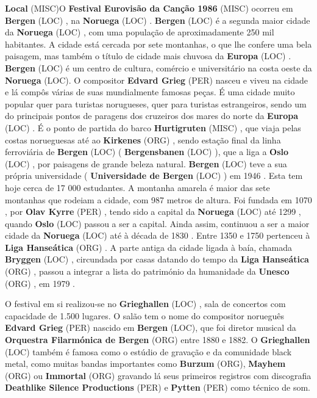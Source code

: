\documentclass[12pt,a4paper]{article}
\begin{document}
\textbf{Local} (MISC)O \textbf{Festival Eurovisão da Canção 1986} (MISC) ocorreu em \textbf{Bergen} (LOC) , na \textbf{Noruega} (LOC) . \textbf{Bergen} (LOC) é a segunda maior cidade da \textbf{Noruega} (LOC) , com uma população de aproximadamente 250 mil habitantes. A cidade está cercada por sete montanhas, o que lhe confere uma bela paisagem, mas também o título de cidade mais chuvosa da \textbf{Europa} (LOC) . \textbf{Bergen} (LOC) é um centro de cultura, comércio e universitário na costa oeste da \textbf{Noruega} (LOC). O compositor \textbf{Edvard Grieg} (PER) nasceu e viveu na cidade e lá compôs várias de suas mundialmente famosas peças. É uma cidade muito popular quer para turistas norugueses, quer para turistas estrangeiros, sendo um do principais pontos de paragens dos cruzeiros dos mares do norte da \textbf{Europa} (LOC) . É o ponto de partida do barco \textbf{Hurtigruten} (MISC) , que viaja pelas costas norueguesas até ao \textbf{Kirkenes} (ORG) , sendo estação final da linha ferroviária de \textbf{Bergen} (LOC) ( \textbf{Bergensbanen} (LOC) ), que a liga a \textbf{Oslo} (LOC) , por paisagens de grande beleza natural. \textbf{Bergen} (LOC) teve a sua própria universidade ( \textbf{Universidade de Bergen} (LOC) ) em 1946 . Esta tem hoje cerca de 17 000 estudantes. A montanha amarela é maior das sete montanhas que rodeiam a cidade, com 987 metros de altura. Foi fundada em 1070 , por \textbf{Olav Kyrre} (PER) , tendo sido a capital da \textbf{Noruega} (LOC) até 1299 , quando \textbf{Oslo} (LOC) passou a ser a capital. Ainda assim, continuou a ser a maior cidade da \textbf{Noruega} (LOC) até à década de 1830 . Entre 1350 e 1750 pertenceu à \textbf{Liga Hanseática} (ORG) . A parte antiga da cidade ligada à baía, chamada \textbf{Bryggen} (LOC) , circundada por casas datando do tempo da \textbf{Liga Hanseática} (ORG) , passou a integrar a lista do património da humanidade da \textbf{Unesco} (ORG) , em 1979 .

O festival em si realizou-se no \textbf{Grieghallen} (LOC) , sala de concertos com capacidade de 1.500 lugares. O salão tem o nome do compositor norueguês \textbf{Edvard Grieg} (PER) nascido em \textbf{Bergen} (LOC), que foi diretor musical da \textbf{Orquestra Filarmónica de Bergen} (ORG) entre 1880 e 1882. O \textbf{Grieghallen} (LOC) também é famosa como o estúdio de gravação e da comunidade black metal, como muitas bandas importantes como \textbf{Burzum} (ORG), \textbf{Mayhem} (ORG) ou \textbf{Immortal} (ORG) gravando lá seus primeiros registros com discografia \textbf{Deathlike Silence Productions} (PER) e \textbf{Pytten} (PER) como técnico de som.
\end{document}
